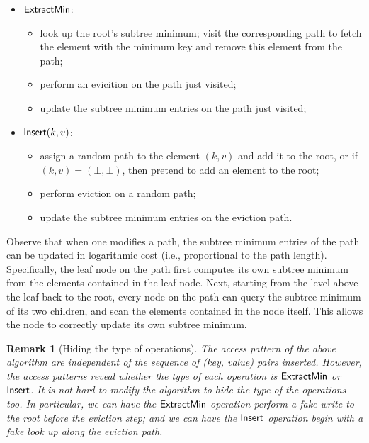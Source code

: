 \documentclass[11pt]{article}
\newtheorem{remark}{Remark}
\begin{document}
\begin{itemize}
\item 
${\sf ExtractMin}$: 
\begin{itemize}
\item 
look up the root's subtree minimum; 
visit the corresponding path
to fetch the element with the minimum key and remove this element from the path;
\item 
perform an evicition on the path just visited;
\item 
update the subtree minimum entries 
on the path just visited;
\end{itemize}
\item 
${\sf Insert}(k, v)$:
\begin{itemize}
\item 
assign a random path to the element $(k, v)$ 
and add it to the root, or if $(k, v) = (\bot, \bot)$,
then pretend to add an element to the root; 
\item 
perform eviction on a random path;
\item 
update the subtree minimum entries 
on the eviction path.
\end{itemize}
\end{itemize}
Observe that when one modifies a path, the subtree minimum entries
of the path can be updated 
in logarithmic cost (i.e., proportional to the path length).
Specifically, the leaf node on the path first computes
its own subtree minimum from the elements contained in the leaf node. 
Next, 
starting from the level above 
the leaf back to the root, 
every node 
on the path can query the subtree minimum 
of its two children, and scan the elements contained in the node itself.
This allows the node to correctly update
its own subtree minimum.

\begin{remark}[Hiding the type of operations]
The access pattern of the above algorithm 
are independent of the 
sequence of (key, value)
pairs inserted. 
However, 
the access patterns reveal whether the type of each operation 
is ${\sf ExtractMin}$
or ${\sf Insert}$.
It is not hard to modify the algorithm to hide
the type of the operations too. 
In particular, we can have the  ${\sf ExtractMin}$ operation 
perform a fake write to the root before the eviction step;
and we can have the ${\sf Insert}$
operation begin with a fake look up 
along the eviction path.
\end{remark}
\end{document}
